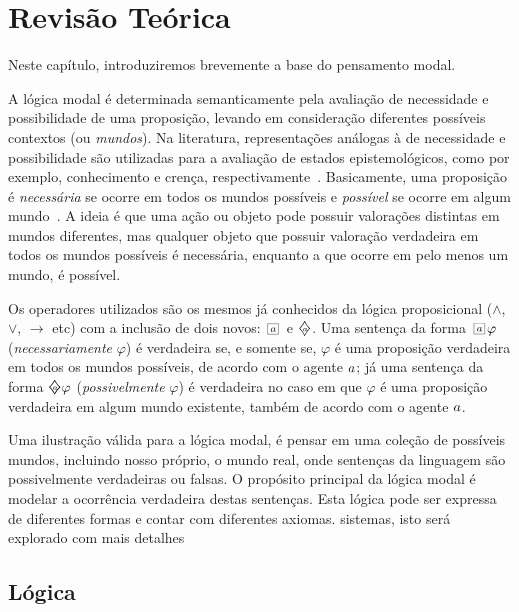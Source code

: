 \chapter{Revisão Teórica}
\label{cap:teo}

Neste capítulo, introduziremos brevemente a base do pensamento modal. 

A lógica modal é determinada semanticamente pela avaliação de necessidade e
possibilidade de uma proposição, levando em consideração diferentes possíveis
contextos (ou \emph{mundos}). Na literatura, representações análogas à de
necessidade e possibilidade são utilizadas para a avaliação de estados
epistemológicos, como por exemplo, conhecimento e crença,
respectivamente~\cite{belief}. Basicamente, uma proposição é \textit{necessária}
se ocorre em todos os mundos possíveis e \textit{possível} se ocorre em algum
mundo~\cite{chellas:modal_logic}.  A ideia é que uma ação ou objeto pode
possuir valorações distintas em mundos diferentes, mas qualquer objeto que
possuir valoração verdadeira em todos os mundos possíveis é necessária, enquanto
a que ocorre em pelo menos um mundo, é possível.

Os operadores utilizados são os mesmos já conhecidos da lógica proposicional
($\wedge$, $\vee$, $\rightarrow$ etc) com a inclusão de dois novos:
$\nec{\agent}$ e $\pos{\agent}$. Uma sentença da forma $\nec{\agent} \varphi$
(\textit{necessariamente} $\varphi$) é verdadeira se, e somente se, $\varphi$ é
uma proposição verdadeira em todos os mundos possíveis, de acordo com o agente
$a$; já uma sentença da forma $\pos{\agent} \varphi$
(\textit{possivelmente} $\varphi$) é verdadeira no caso em que $\varphi$ é uma
proposição verdadeira em algum mundo existente, também de acordo com o agente
$a$.

Uma ilustração válida para a lógica modal, é pensar em uma coleção de possíveis
mundos, incluindo nosso próprio, o mundo real, onde sentenças da linguagem são
possivelmente verdadeiras ou falsas. O propósito principal da lógica modal é
modelar a ocorrência verdadeira destas sentenças. Esta lógica pode ser expressa
de diferentes formas e contar com diferentes axiomas. %
sistemas, isto será explorado com mais detalhes 

\section{Lógica}
\label{sec:logicas}



